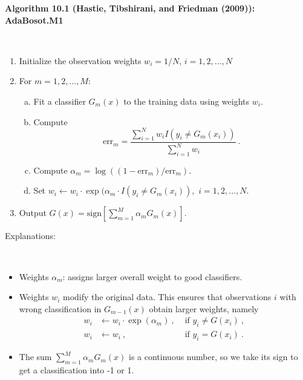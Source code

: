 \documentclass[
  10pt,
  ignorenonframetext,
]{beamer}
\providecommand{\tightlist}{%
  \setlength{\itemsep}{0pt}\setlength{\parskip}{0pt}}
\begin{document}
\begin{frame}
\textbf{Algorithm 10.1 (Hastie, Tibshirani, and Friedman (2009)):
AdaBosot.M1}

\(~\)

\begin{enumerate}
\tightlist
\item
  Initialize the observation weights \(w_i= 1/N\), \(i=1,2,\ldots, N\)
\end{enumerate}

\vspace{2mm}

\begin{enumerate}
\setcounter{enumi}{1}
\tightlist
\item
  For \(m=1,2,...,M\):

  \begin{enumerate}
  [a)]
  \tightlist
  \item
    Fit a classifier \(G_m(x)\) to the training data using weights
    \(w_i\).
  \item
    Compute
    \[\text{err}_m = \frac{\sum_{i=1}^N w_i I(y_i\neq G_m(x_i))}{\sum_{i=1}^N w_i} \ .\]
  \item
    Compute \(\alpha_m = \log((1-\text{err}_m)/\text{err}_m)\).
  \item
    Set
    \(w_i \leftarrow w_i \cdot \exp(\alpha_m \cdot I(y_i\neq G_m(x_i)),\)
    \(i=1,2,\ldots, N\).
  \end{enumerate}
\end{enumerate}

\vspace{2mm}

\begin{enumerate}
\setcounter{enumi}{2}
\tightlist
\item
  Output
  \(G(x) = \text{sign}\left[\sum_{m=1}^M \alpha_m G_m(x)\right]\).
\end{enumerate}
\end{frame}

\begin{frame}
Explanations:

\(~\)

\begin{itemize}
\item
  Weights \(\alpha_m\): assigns larger overall weight to good
  classifiers.
\item
  Weights \(w_i\) modify the original data. This ensures that
  observations \(i\) with wrong classification in \(G_{m-1}(x)\) obtain
  larger weights, namely \begin{align*} 
   w_i &\leftarrow w_i \cdot \exp(\alpha_m) \ , &\text{ if } y_i \neq G(x_i) \ , \\
   w_i &\leftarrow w_i \ , &\text{ if } y_i = G(x_i) \ .
   \end{align*}
\item
  The sum \(\sum_{m=1}^M \alpha_m G_m(x)\) is a continuous number, so we
  take its sign to get a classification into -1 or 1.
\end{itemize}
\end{frame}
\end{document}
